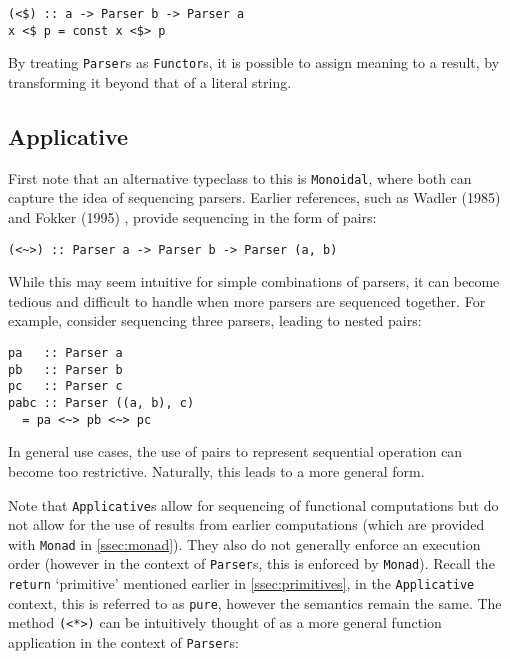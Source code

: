 \begin{verbatim}
(<$) :: a -> Parser b -> Parser a
x <$ p = const x <$> p
\end{verbatim}

By treating \texttt{Parser}s as \texttt{Functor}s, it is possible to assign meaning to a result, by transforming it beyond that of a literal string.

\subsection{Applicative}
\label{ssec:applicative}

First note that an alternative typeclass to this is \texttt{Monoidal}, where both can capture the idea of sequencing parsers.
Earlier references, such as Wadler (1985) \cite{wadler85} and Fokker (1995) \cite{fokker95}, provide sequencing in the form of pairs:

\begin{verbatim}
(<~>) :: Parser a -> Parser b -> Parser (a, b)
\end{verbatim}

While this may seem intuitive for simple combinations of parsers, it can become tedious and difficult to handle when more parsers are sequenced together.
For example, consider sequencing three parsers, leading to nested pairs:

\begin{verbatim}
pa   :: Parser a
pb   :: Parser b
pc   :: Parser c
pabc :: Parser ((a, b), c)
  = pa <~> pb <~> pc
\end{verbatim}

In general use cases, the use of pairs to represent sequential operation can become too restrictive.
Naturally, this leads to a more general form.

Note that \texttt{Applicative}s allow for sequencing of functional computations but do not allow for the use of results from earlier computations (which are provided with \texttt{Monad} in \autoref{ssec:monad}).
They also do not generally enforce an execution order (however in the context of \texttt{Parser}s, this is enforced by \texttt{Monad}).
Recall the \texttt{return} `primitive' mentioned earlier in \autoref{ssec:primitives}, in the \texttt{Applicative} context, this is referred to as \texttt{pure}, however the semantics remain the same.
The method \texttt{(<*>)} can be intuitively thought of as a more general function application \cite{hutton16} in the context of \texttt{Parser}s:

